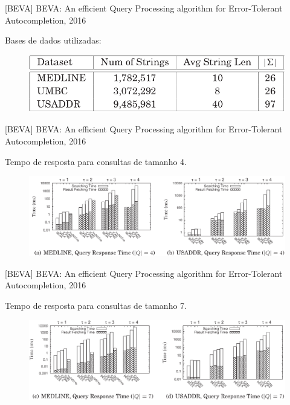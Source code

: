 \documentclass[11pt]{beamer}
\begin{document}
\begin{frame}{[BEVA] BEVA: An efficient Query Processing algorithm for Error-Tolerant Autocompletion, 2016}

    Bases de dados utilizadas:
    
    \begin{figure}
      \includegraphics[scale=0.40]{pictures/datasets_beva.png}
      \centering
    \end{figure}
   
\end{frame}

\begin{frame}{[BEVA] BEVA: An efficient Query Processing algorithm for Error-Tolerant Autocompletion, 2016}

    Tempo de resposta para consultas de tamanho 4.
    
    \begin{figure}
      \includegraphics[scale=0.30]{pictures/time_response_length_4_beva.png}
      \centering
    \end{figure}
   
\end{frame}

\begin{frame}{[BEVA] BEVA: An efficient Query Processing algorithm for Error-Tolerant Autocompletion, 2016}

    Tempo de resposta para consultas de tamanho 7.
    
    \begin{figure}
      \includegraphics[scale=0.30]{pictures/time_response_length_7_beva.png}
      \centering
    \end{figure}
   
\end{frame}
\end{document}
